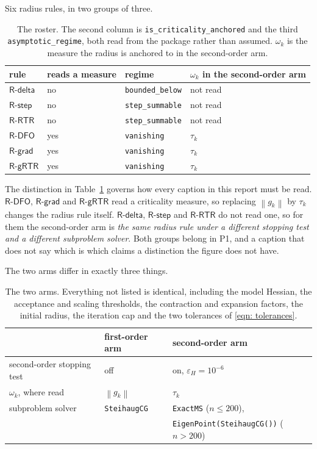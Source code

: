 \documentclass[11pt,a4paper]{article}
\providecommand{\norm}[1]{\left \lVert #1 \right \rVert}
\providecommand{\Rdelta}{\textsf{R-delta}}
\providecommand{\Rstep}{\textsf{R-step}}
\providecommand{\Rdfo}{\textsf{R-DFO}}
\providecommand{\Rgrad}{\textsf{R-grad}}
\providecommand{\Rrtr}{\textsf{R-RTR}}
\providecommand{\Rgrtr}{\textsf{R-gRTR}}
\theoremstyle{remark}
\begin{document}
Six radius rules, in two groups of three.

\begin{table}[H]
  \centering
  \caption{The roster. The second column is \texttt{is\_criticality\_anchored} and
    the third \texttt{asymptotic\_regime}, both read from the package rather than
    assumed. $\omega_k$ is the measure the radius is anchored to in the
    second-order arm.}
  \label{tab: roster}
  \begin{tabular}{llll}
    \toprule
    rule & reads a measure & regime & $\omega_k$ in the second-order arm \\
    \midrule
    $\Rdelta$ & no  & \texttt{bounded\_below} & not read \\
    $\Rstep$  & no  & \texttt{step\_summable} & not read \\
    $\Rrtr$   & no  & \texttt{step\_summable} & not read \\
    $\Rdfo$   & yes & \texttt{vanishing}      & $\tau_k$ \\
    $\Rgrad$  & yes & \texttt{vanishing}      & $\tau_k$ \\
    $\Rgrtr$  & yes & \texttt{vanishing}      & $\tau_k$ \\
    \bottomrule
  \end{tabular}
\end{table}

The distinction in Table~\ref{tab: roster} governs how every caption in this
report must be read. $\Rdfo$, $\Rgrad$ and $\Rgrtr$ read a criticality measure, so
replacing $\norm{g_k}$ by $\tau_k$ changes the radius rule itself. $\Rdelta$,
$\Rstep$ and $\Rrtr$ do not read one, so for them the second-order arm is
\emph{the same radius rule under a different stopping test and a different
subproblem solver}. Both groups belong in P1, and a caption that does not say
which is which claims a distinction the figure does not have.

The two arms differ in exactly three things.

\begin{table}[H]
  \centering
  \caption{The two arms. Everything not listed is identical, including the model
    Hessian, the acceptance and scaling thresholds, the contraction and expansion
    factors, the initial radius, the iteration cap and the two tolerances of
    \eqref{eqn: tolerances}.}
  \label{tab: arms}
  \begin{tabular}{lll}
    \toprule
     & first-order arm & second-order arm \\
    \midrule
    second-order stopping test & off & on, $\varepsilon_H = 10^{-6}$ \\
    $\omega_k$, where read     & $\norm{g_k}$ & $\tau_k$ \\
    subproblem solver          & \texttt{SteihaugCG}
                               & \texttt{ExactMS} ($n \leq 200$), \\
                               & & \texttt{EigenPoint(SteihaugCG())} ($n > 200$) \\
    \bottomrule
  \end{tabular}
\end{table}
\end{document}

